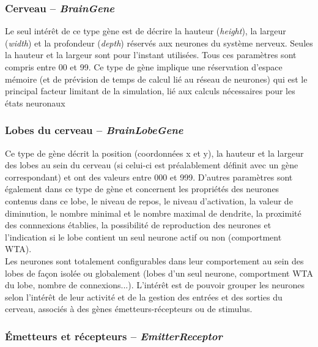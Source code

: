 \documentclass[11pt,twoside,a4paper]{article}
\begin{document}
\subsubsection{Cerveau -- \emph{BrainGene}}

Le seul int{\'e}r{\^e}t de ce type g{\`e}ne est de d{\'e}crire la hauteur (\textit{height}), la largeur (\textit{width}) et la profondeur (\textit{depth}) r{\'e}serv{\'e}s aux neurones du syst{\`e}me nerveux. Seules la hauteur et la largeur sont pour l'instant utilis{\'e}es. Tous ces param{\`e}tres sont compris entre 00 et 99. Ce type de g{\`e}ne implique une r{\'e}servation d'espace m{\'e}moire (et de pr{\'e}vision de temps de calcul li{\'e} au r{\'e}seau de neurones) qui est le principal facteur limitant de la simulation, li{\'e} aux calculs n{\'e}cessaires pour les {\'e}tats neuronaux

\subsubsection{Lobes du cerveau -- \emph{BrainLobeGene}}

Ce type de g{\`e}ne d{\'e}crit la position (coordonn{\'e}es x et y), la hauteur et la largeur des lobes au sein du cerveau (si celui-ci est pr{\'e}alablement d{\'e}finit avec un g{\`e}ne correspondant) et ont des valeurs entre 000 et 999. D'autres param{\`e}tres sont {\'e}galement dans ce type de g{\`e}ne et concernent les propri{\'e}t{\'e}s des neurones contenus dans ce lobe, le niveau de repos, le niveau d'activation, la valeur de diminution, le nombre minimal et le nombre maximal de dendrite, la proximit{\'e} des connnexions {\'e}tablies, la possibilit{\'e} de reproduction des neurones et l'indication si le lobe contient un seul neurone actif ou non (comportment WTA).~\\

Les neurones sont totalement configurables dans leur comportement au sein des lobes de fa\c{c}on isol{\'e}e ou globalement (lobes d'un seul neurone, comportment WTA du lobe, nombre de connexions...). L'int{\'e}r{\^e}t est de pouvoir grouper les neurones selon l'int{\'e}r{\^e}t de leur activit{\'e} et de la gestion des entr{\'e}es et des sorties du cerveau, associ{\'e}s {\`a} des g{\`e}nes {\'e}metteurs-r{\'e}cepteurs ou de stimulus. 

\subsubsection{{\'E}metteurs et r{\'e}cepteurs -- \emph{EmitterReceptor}}
\end{document}
